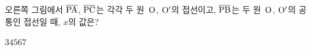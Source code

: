 \noindent\begin{minipage}[t]{0.58\linewidth}\vspace{0pt}\raggedright 오른쪽 그림에서 $\overline{\mathrm{PA}}$, $\overline{\mathrm{PC}}$는 각각 두 원~$\mathrm{O}$, $\mathrm{O'}$의 접선이고, $\overline{\mathrm{PB}}$는 두 원~$\mathrm{O}$, $\mathrm{O'}$의 공통인 접선일 때, $x$의 값은?\end{minipage}\hfill\begin{minipage}[t]{0.4\linewidth}\vspace{0pt}\centering \resizebox{\ifdim\width>\linewidth\linewidth\else\width\fi}{!}{}\end{minipage}\par
\begin{choicesii}{$3$}{$4$}{$5$}{$6$}{$7$}\end{choicesii}
